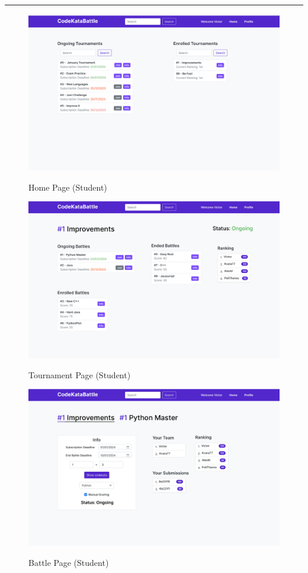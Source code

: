 \documentclass{Configuration_Files/Template}
\begin{document}
{\color{bluepoli}\rule{\linewidth}{0.1pt}}

\begin{figure}[H]
\centering
\includegraphics[scale = 0.25]{Images/UI/MainPage_Student.png}\\
\caption{Home Page (Student)}
\end{figure}

\begin{figure}[H]
\centering
\includegraphics[scale = 0.25]{Images/UI/TournamentPage_Student.png}\\
\caption{Tournament Page (Student)}
\end{figure}

\begin{figure}[H]
\centering
\includegraphics[scale = 0.25]{Images/UI/BattlePage_Student.png}\\
\caption{Battle Page (Student)}
\end{figure}
\end{document}

